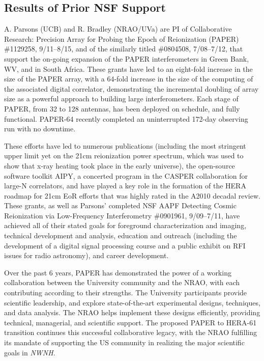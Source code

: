 \documentclass[preprint]{aastex}
\def\nwnh{{\sl NWNH}}
\begin{document}
\vspace{-0.25in}
\subsection{Results of Prior NSF Support}
\vspace{-6pt}

A. Parsons (UCB) and R. Bradley (NRAO/UVa) are PI
of Collaborative Research: Precision Array for Probing
the Epoch of Reionization (PAPER) \#1129258, 9/11--8/15, and of the similarly
titled \#0804508, 7/08--7/12, that support the on-going expansion of the PAPER
interferometers in Green Bank, WV, and in South Africa.  These grants have led
to an eight-fold increase in the size of the PAPER array, with a 64-fold
increase in the size of the computing of the associated digital correlator,
demonstrating the incremental doubling of array size as a powerful approach to
building large interferometers.  Each stage of PAPER, from 32 to 128 antennas, has
been deployed on schedule, and fully functional.  PAPER-64 recently completed an uninterrupted 172-day
observing run with no downtime.

These efforts have led to numerous
publications (including the most stringent upper limit yet on the 21cm reionization power spectrum,
which was used to show that x-ray heating took place in the early universe),
the open-source software toolkit AIPY, a concerted program
in the CASPER collaboration for large-N correlators, and have played a key role
in the formation of the HERA roadmap for 21cm EoR efforts that was highly rated
in the A2010 decadal review.  These grants, as well as Parsons' 
completed NSF AAPF Detecting Cosmic Reionization via Low-Frequency
Interferometry \#0901961, 9/09--7/11, have achieved all of their stated goals
for foreground characterization and imaging, technical development and
analysis, education and outreach (including the development of a digital signal
processing course and a public exhibit on RFI issues for radio astronomy), and
career development.

Over the past 6 years, PAPER has demonstrated the power of a working
collaboration between the University community and the NRAO, with each 
contributing according to their strengths.  The
University participants provide scientific leadership, and
explore state-of-the-art experimental designs, techniques, and data
analysis. The NRAO helps implement these designs efficiently,
providing technical, managerial, and scientific support.  The
proposed PAPER to HERA-61 transition continues this successful
collaborative legacy, with the NRAO fulfilling its mandate of
supporting the US community in realizing the major scientific
goals in \nwnh. 
\end{document}
